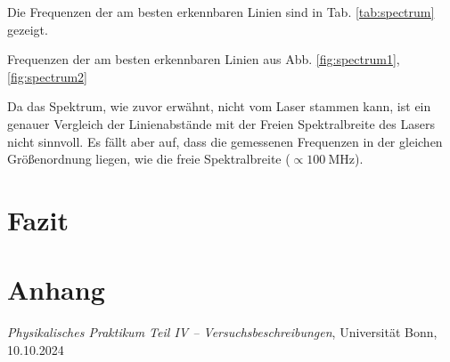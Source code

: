 \documentclass{article}
\newcommand*{\tablePath}{../data} %
\begin{document}
Die Frequenzen der am besten erkennbaren Linien sind in Tab. \ref{tab:spectrum} gezeigt.
\begin{table}[h]
  
  \caption{Frequenzen der am besten erkennbaren Linien aus Abb. \ref{fig:spectrum1}, \ref{fig:spectrum2}}
\end{table}
Da das Spektrum, wie zuvor erwähnt, nicht vom Laser stammen kann, ist ein genauer Vergleich der Linienabstände
mit der Freien Spektralbreite des Lasers nicht sinnvoll. Es fällt aber auf, dass die gemessenen Frequenzen in
der gleichen Größenordnung liegen, wie die freie Spektralbreite ($\propto \SI{100}{\MHz}$).




\clearpage
\section{Fazit}



\clearpage
\section{Anhang}



\clearpage
\begin{thebibliography}{9}

\textit{Physikalisches Praktikum Teil IV -- Versuchsbeschreibungen}, Universität Bonn, 10.10.2024



\end{thebibliography}
\end{document}
